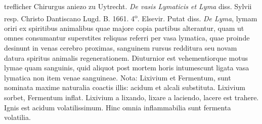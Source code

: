  treflicher Chirurgus aniezo zu Uytrecht.\protect{}
\pend%
\pstart%
\textit{De vasis Lymaticis et Lyma} diss. Sylvii\protect{} resp. Christo \protect{} Dantiscano Lugd. B.\protect{} 1661. 4\textsuperscript{o}. Elsevir.
\pend%
\pstart%
Putat \protect{}
diss. \textit{De Lyma}, lymam oriri ex spiritibus animalibus quae majore copia partibus alterantur, quam ut omnes consumantur superstites reliquas referri per vasa lymatica, quae proinde desinunt in venas cerebro proximas, sanguinem rursus redditura  seu novam datura spiritus animalis regenerationem. Diuturnior est vehementiorque motus lymae quam sanguinis, quid aliquot post mortem horis intumescunt ligata vasa lymatica non item venae sanguineae.
\pend%
\pstart%
Nota: Lixivium et Fermentum, sunt nominata maxime naturalia coactis illis: acidum et alcali substituta. Lixivium sorbet, Fermentum inflat. Lixivium a lixando, lixare a laciendo, lacere est trahere. Ignis est acidum volatilissimum. Hinc omnia inflammabilia sunt fermenta volatilia.
\pend%
\count{}
\count{}
\count{}
